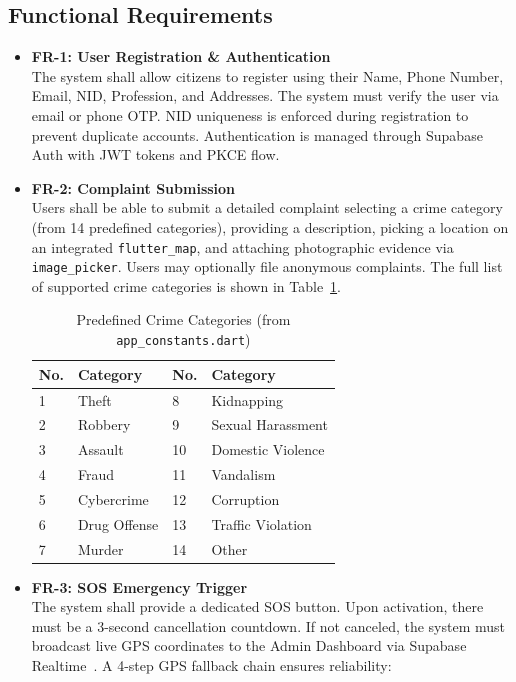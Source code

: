 \documentclass[12pt, a4paper, twoside]{report}
\begin{document}
\subsection{Functional Requirements}
\begin{itemize}[label={}, itemsep=1em]
    \item \textbf{FR-1: User Registration \& Authentication}\\
    The system shall allow citizens to register using their Name, Phone Number, Email, NID, Profession, and Addresses. The system must verify the user via email or phone OTP. NID uniqueness is enforced during registration to prevent duplicate accounts. Authentication is managed through Supabase Auth with JWT tokens and PKCE flow.
    \item \textbf{FR-2: Complaint Submission}\\
    Users shall be able to submit a detailed complaint selecting a crime category (from 14 predefined categories), providing a description, picking a location on an integrated \texttt{flutter\_map}, and attaching photographic evidence via \texttt{image\_picker}. Users may optionally file anonymous complaints. The full list of supported crime categories is shown in Table~\ref{tab:categories}.
    \begin{table}[ht]
    \centering
    \caption{Predefined Crime Categories (from \texttt{app\_constants.dart})}
    \label{tab:categories}
    \begin{tabularx}{\textwidth}{X l X l}
    \toprule
    \textbf{No.} & \textbf{Category} & \textbf{No.} & \textbf{Category} \\
    \midrule
    1 & Theft & 8 & Kidnapping \\
    2 & Robbery & 9 & Sexual Harassment \\
    3 & Assault & 10 & Domestic Violence \\
    4 & Fraud & 11 & Vandalism \\
    5 & Cybercrime & 12 & Corruption \\
    6 & Drug Offense & 13 & Traffic Violation \\
    7 & Murder & 14 & Other \\
    \bottomrule
    \end{tabularx}
    \end{table}
    \item \textbf{FR-3: SOS Emergency Trigger}\\
    The system shall provide a dedicated SOS button. Upon activation, there must be a 3-second cancellation countdown. If not canceled, the system must broadcast live GPS coordinates to the Admin Dashboard via Supabase Realtime~\cite{realtime, sockets}. A 4-step GPS fallback chain ensures reliability:

\end{itemize}
\end{document}
